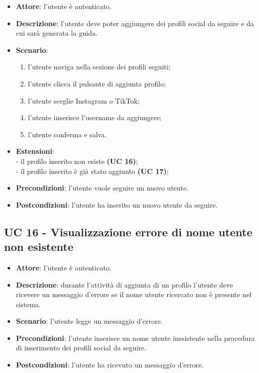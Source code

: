 \begin{itemize}
    \item \textbf{Attore}: l'utente è autenticato.
    \item \textbf{Descrizione}: l'utente deve poter aggiungere dei profili social da seguire e da cui sarà generata la guida.
    \item \textbf{Scenario}:
    \begin{enumerate}
        \item l'utente naviga nella sezione dei profili seguiti;
        \item l'utente clicca il pulsante di aggiunta profilo;
        \item l'utente sceglie Instagram o TikTok;
        \item l'utente inserisce l'username da aggiungere;
        \item l'utente conferma e salva.
    \end{enumerate}
    \item \textbf{Estensioni}:\\
        - il profilo inserito non esiste \textbf{(UC 16)};\\
        - il profilo inserito è già stato aggiunto \textbf{(UC 17)};\\

    \item \textbf{Precondizioni}: l'utente vuole seguire un nuovo utente.
    \item \textbf{Postcondizioni}: l'utente ha inserito un nuovo utente da seguire.
\end{itemize}

\subsection{UC 16 - Visualizzazione errore di nome utente non esistente}
\begin{itemize}
    \item \textbf{Attore}: l'utente è autenticato.
    \item \textbf{Descrizione}: durante l'attività di aggiunta di un profilo l'utente deve ricevere un messaggio d'errore se il nome utente ricercato non è presente nel sistema.
    \item \textbf{Scenario}: l'utente legge un messaggio d'errore. 
    \item \textbf{Precondizioni}: l'utente inserisce un nome utente inesistente nella procedura di inserimento dei profili social da seguire.
    \item \textbf{Postcondizioni}: l'utente ha ricevuto un messaggio d'errore.
\end{itemize}

